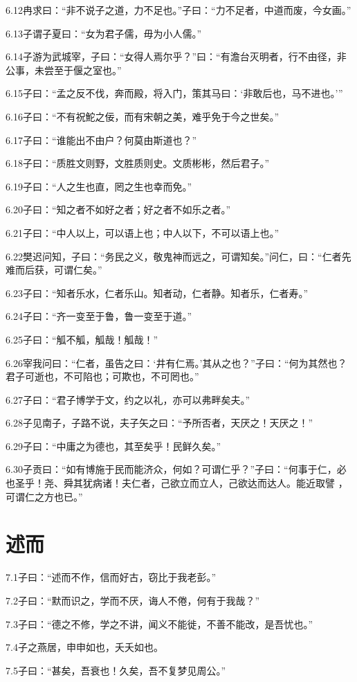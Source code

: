 \documentclass[a4paper,12pt,UTF8,twoside]{ctexbook}
\begin{document}
6.12冉求曰：“非不说子之道，力不足也。”子曰：“力不足者，中道而废，今女画。”

6.13子谓子夏曰：“女为君子儒，毋为小人儒。”

6.14子游为武城宰，子曰：“女得人焉尔乎？”曰：“有澹台灭明者，行不由径，非公事，未尝至于偃之室也。”

6.15子曰：“孟之反不伐，奔而殿，将入门，策其马曰：‘非敢后也，马不进也。’”

6.16子曰：“不有祝鮀之佞，而有宋朝之美，难乎免于今之世矣。”

6.17子曰：“谁能出不由户？何莫由斯道也？”

6.18子曰：“质胜文则野，文胜质则史。文质彬彬，然后君子。”

6.19子曰：“人之生也直，罔之生也幸而免。”

6.20子曰：“知之者不如好之者；好之者不如乐之者。”

6.21子曰：“中人以上，可以语上也；中人以下，不可以语上也。”

6.22樊迟问知，子曰：“务民之义，敬鬼神而远之，可谓知矣。”问仁，曰：“仁者先难而后获，可谓仁矣。”

6.23子曰：“知者乐水，仁者乐山。知者动，仁者静。知者乐，仁者寿。”

6.24子曰：“齐一变至于鲁，鲁一变至于道。”

6.25子曰：“觚不觚，觚哉！觚哉！”

6.26宰我问曰：“仁者，虽告之曰：‘井有仁焉。’其从之也？”子曰：“何为其然也？君子可逝也，不可陷也；可欺也，不可罔也。”

6.27子曰：“君子博学于文，约之以礼，亦可以弗畔矣夫。”

6.28子见南子，子路不说，夫子矢之曰：“予所否者，天厌之！天厌之！”

6.29子曰：“中庸之为德也，其至矣乎！民鲜久矣。”

6.30子贡曰：“如有博施于民而能济众，何如？可谓仁乎？”子曰：“何事于仁，必也圣乎！尧、舜其犹病诸！夫仁者，己欲立而立人，己欲达而达人。能近取譬
，可谓仁之方也已。”

\chapter{述而}
7.1子曰：“述而不作，信而好古，窃比于我老彭。”

7.2子曰：“默而识之，学而不厌，诲人不倦，何有于我哉？”

7.3子曰：“德之不修，学之不讲，闻义不能徙，不善不能改，是吾忧也。”

7.4子之燕居，申申如也，夭夭如也。

7.5子曰：“甚矣，吾衰也！久矣，吾不复梦见周公。”
\end{document}
